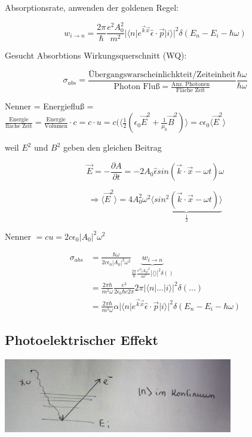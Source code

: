 Absorptionsrate, anwenden der goldenen Regel:

\[ w_{i\rightarrow n} = \frac{2\pi}{\hbar} \frac{e^2 A_0^2}{m^2} |\langle n|e^{\vec k\vec x}\hat \epsilon\cdot\vec p|i\rangle |^2 \delta(E_n-E_i-\hbar\omega)\]

Gesucht Absorbtions Wirkungsquerschnitt (WQ):

\[ \sigma_{abs} = \frac{\text{Übergangswarscheinlichkteit/Zeiteinheit}}{\text{Photon Fluß} = \frac{\text{Anz. Photonen}}{\text{Fläche Zeit}}}\frac{\hbar\omega}{\hbar\omega}\]

Nenner = Energiefluß = \(\frac{\text{Energie}}{\text{fläche Zeit}} = \frac{\text{Energie}}{\text{Volumen}}\cdot c = c\cdot u= c(\langle \frac{1}{2}(\epsilon_0\vec E^2 +\frac{1}{\mu_0}\vec B^2)\rangle = c\epsilon_0\langle \vec E^2\rangle \)

weil \(E^2\) und \(B^2\) geben den gleichen Beitrag

\[ \vec E = -\frac{\partial A}{\partial t} = -2A_0\hat \epsilon sin(\vec k\cdot\vec x -\omega t)\omega\]

\[\Rightarrow \langle \vec E^2\rangle = 4A_0^2\omega^2 \underbrace{\langle sin^2(\vec k\cdot\vec x -\omega t)\rangle }_{\frac{1}{2}}\]

Nenner \(=cu=2c\epsilon_0|A_0|^2\omega^2\)

\begin{align}
  \sigma_{abs} &= \frac{\hbar \omega}{2c\epsilon_0|A_0|^2\omega^2}\underbrace{ w_{i\rightarrow n}}_{\frac{2\pi}{\hbar}\frac{e^2|A_0|^2}{m^2}|\langle \rangle |^2\delta()}\\
  &= \frac{2\pi\hbar}{m^2\omega}\frac{e^2}{2\epsilon_0\hbar c 2\pi}2\pi |\langle n|...|i\rangle|^2\delta(...)\\
  &=\frac{2\pi\hbar}{m^2\omega}\alpha |\langle n|e^{\vec k\vec x}\hat \epsilon\cdot\vec p|i\rangle|^2\delta(E_n-E_i-\hbar\omega)
\end{align}


\subsection{Photoelektrischer Effekt}

\includegraphics[width=0.75\textwidth]{kap03_10.png}


